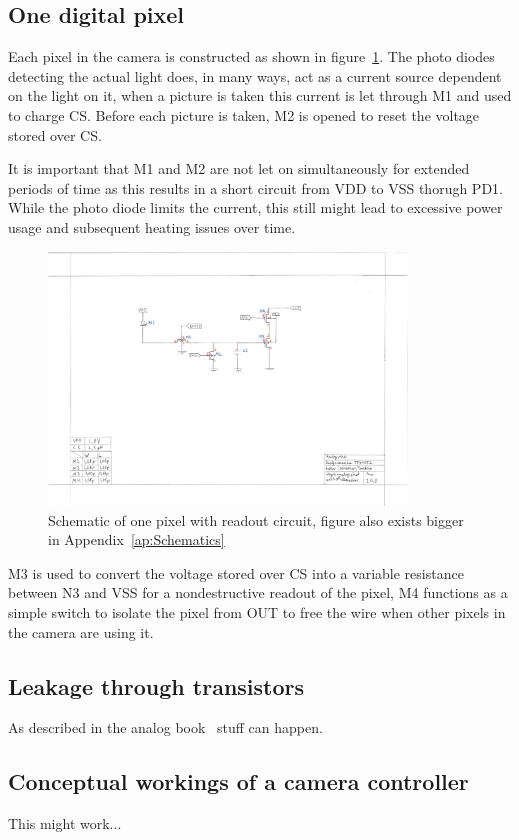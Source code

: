 
\subsection{One digital pixel}


Each pixel in the camera is constructed as shown in figure~\ref{fig:pixelschematic}.
The photo diodes detecting the actual light does, in many ways, act as a current source dependent on the light on it, when a picture is taken this
current is let through M1 and used to charge CS.
Before each picture is taken, M2 is opened to reset the voltage stored over CS.

It is important that M1 and M2 are not let on simultaneously for extended periods of time as this results in a short circuit from VDD to VSS thorugh PD1.
While the photo diode limits the current, this still might lead to excessive power usage and subsequent heating issues over time.


\begin{figure}[htbp]
  \centering
  \includegraphics[width=0.85\textwidth]{figures/SchematicPixel}
  \caption{Schematic of one pixel with readout circuit, figure also exists bigger in Appendix~\ref{ap:Schematics}}
  \label{fig:pixelschematic}
\end{figure}


M3 is used to convert the voltage stored over CS into a variable resistance between N3 and VSS for a nondestructive readout of the pixel,
M4 functions as a simple switch to isolate the pixel from OUT to free the wire when other pixels in the camera are using it.



\subsection{Leakage through transistors}

As described in the analog book~\cite{AnalogBook} stuff can happen.

\subsection{Conceptual workings of a camera controller}

This might work...